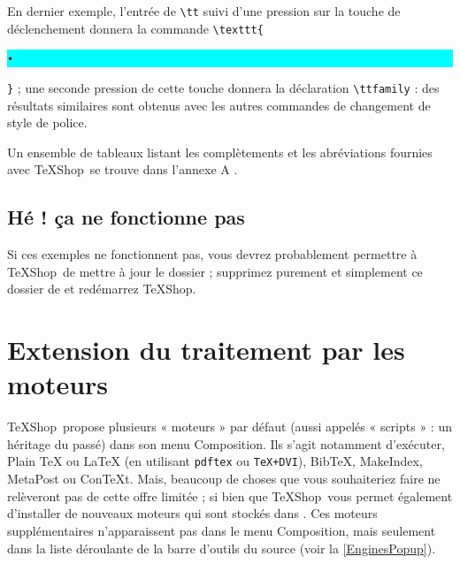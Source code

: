 \documentclass[11pt,french]{article}
\newcommand{\TS}{\textsf{\TeX Shop}}
\newcommand{\mnu}[1]{\textsf{#1}}
\newcommand{\selmark}{\colorbox{cyan}{\rule[-0.5ex]{0ex}{2.1ex}\texttt{•}}}
\begin{document}
En dernier exemple, l'entrée de \verb|\tt| suivi d'une pression sur la touche de déclenchement donnera la commande \verb|\texttt{|\selmark\verb|}| ; une seconde pression de cette touche donnera la déclaration \verb|\ttfamily| : des résultats similaires sont obtenus avec les autres commandes de changement de style de police.



Un ensemble de tableaux listant les complètements et les abréviations fournies avec \TS\ se trouve dans l'annexe A  .

\subsection{Hé ! ça ne fonctionne pas}

Si ces exemples ne fonctionnent pas, vous devrez probablement permettre à \TS\ de mettre à jour le dossier  ; supprimez purement et simplement ce dossier de  et redémarrez \TS.



\section{Extension du traitement par les moteurs}

\TS\ propose plusieurs « moteurs » par défaut (aussi appelés « scripts » : un héritage du passé) dans son menu \mnu{Composition}. Ils s'agit notamment d'exécuter, \mnu{Plain TeX} ou \mnu{LaTeX} (en utilisant \texttt{pdftex} ou \texttt{TeX+DVI}), \mnu{BibTeX},  \mnu{MakeIndex}, \mnu{MetaPost} ou \mnu{ConTeXt}. Mais, beaucoup de choses que vous souhaiteriez faire ne relèveront pas de cette offre limitée ; si bien que \TS\ vous permet également d'installer de nouveaux moteurs qui sont stockés dans . Ces moteurs supplémentaires n'apparaissent pas dans le menu \mnu{Composition}, mais seulement dans la liste déroulante de la barre d'outils du source (voir la \vref{EnginesPopup}).
\end{document}

